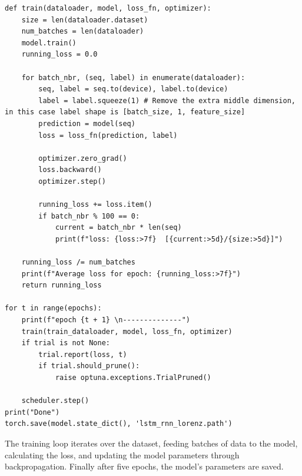 \documentclass[11pt]{article}
\begin{document}
\begin{lstlisting}[caption={Training loop}, label=training:loop]
def train(dataloader, model, loss_fn, optimizer):
    size = len(dataloader.dataset)
    num_batches = len(dataloader)
    model.train()
    running_loss = 0.0

    for batch_nbr, (seq, label) in enumerate(dataloader):
        seq, label = seq.to(device), label.to(device)
        label = label.squeeze(1) # Remove the extra middle dimension, in this case label shape is [batch_size, 1, feature_size]
        prediction = model(seq)
        loss = loss_fn(prediction, label)

        optimizer.zero_grad()
        loss.backward()
        optimizer.step()

        running_loss += loss.item()
        if batch_nbr % 100 == 0:
            current = batch_nbr * len(seq)
            print(f"loss: {loss:>7f}  [{current:>5d}/{size:>5d}]")

    running_loss /= num_batches
    print(f"Average loss for epoch: {running_loss:>7f}")
    return running_loss

for t in range(epochs):
    print(f"epoch {t + 1} \n--------------")
    train(train_dataloader, model, loss_fn, optimizer)
    if trial is not None:
        trial.report(loss, t)
        if trial.should_prune():
            raise optuna.exceptions.TrialPruned()

    scheduler.step()
print("Done")
torch.save(model.state_dict(), 'lstm_rnn_lorenz.path')
\end{lstlisting}
The training loop iterates over the dataset, feeding batches of data to the model, calculating the loss, and updating the model parameters through backpropagation. Finally after five epochs, the model's parameters are saved.
\end{document}
